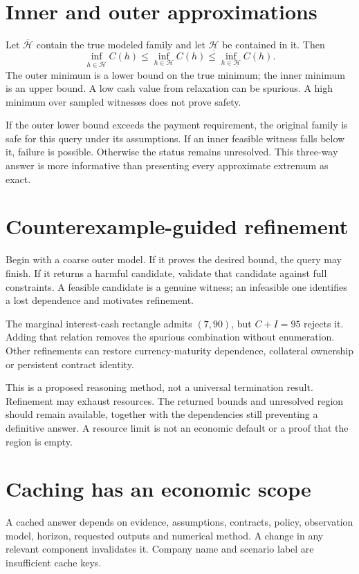 \section{Inner and outer approximations}
Let $\overline{\mathcal H}$ contain the true modeled family and let $\underline{\mathcal H}$ be contained in it. Then
\begin{equation}
 \inf_{h\in\overline{\mathcal H}}C(h)\leq\inf_{h\in\mathcal H}C(h)\leq\inf_{h\in\underline{\mathcal H}}C(h).
 \label{sim:inner-outer}
\end{equation}
The outer minimum is a lower bound on the true minimum; the inner minimum is an upper bound. A low cash value from relaxation can be spurious. A high minimum over sampled witnesses does not prove safety.

If the outer lower bound exceeds the payment requirement, the original family is safe for this query under its assumptions. If an inner feasible witness falls below it, failure is possible. Otherwise the status remains unresolved. This three-way answer is more informative than presenting every approximate extremum as exact.

\section{Counterexample-guided refinement}
Begin with a coarse outer model. If it proves the desired bound, the query may finish. If it returns a harmful candidate, validate that candidate against full constraints. A feasible candidate is a genuine witness; an infeasible one identifies a lost dependence and motivates refinement.

The marginal interest-cash rectangle admits $(7,90)$, but $C+I=95$ rejects it. Adding that relation removes the spurious combination without enumeration. Other refinements can restore currency-maturity dependence, collateral ownership or persistent contract identity.

This is a proposed reasoning method, not a universal termination result. Refinement may exhaust resources. The returned bounds and unresolved region should remain available, together with the dependencies still preventing a definitive answer. A resource limit is not an economic default or a proof that the region is empty.

\section{Caching has an economic scope}
A cached answer depends on evidence, assumptions, contracts, policy, observation model, horizon, requested outputs and numerical method. A change in any relevant component invalidates it. Company name and scenario label are insufficient cache keys.

